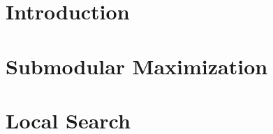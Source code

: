 \begin{abstract}

\end{abstract}

\section{Introduction}


\section{Submodular Maximization}
\label{sec:sub}


\section{Local Search}
\label{sec:local}


